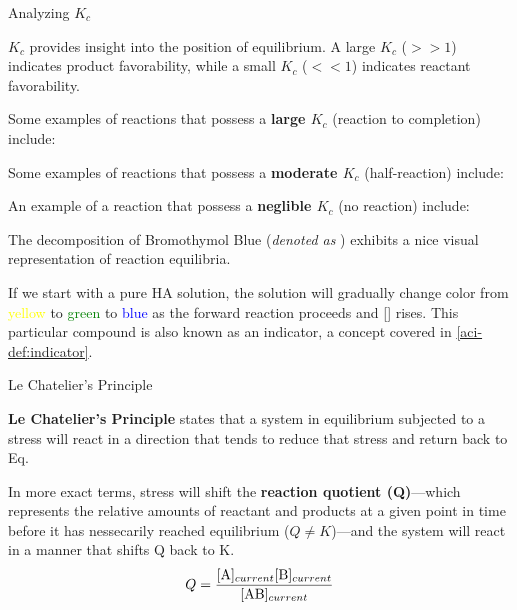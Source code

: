 \documentclass[10pt]{article}
\begin{document}
  \begin{core}{Analyzing $K_c$}
    
    $K_c$ provides insight into the position of equilibrium. A large $K_c$ ($>>1$) indicates product favorability, while a small $K_c$ ($<<1$) indicates reactant favorability.

    Some examples of reactions that possess a \textbf{large $K_c$} (reaction to completion) include:



    Some examples of reactions that possess a \textbf{moderate $K_c$} (half-reaction) include:




    An example of a reaction that possess a \textbf{neglible $K_c$} (no reaction) include:


  \end{core}

  The decomposition of Bromothymol Blue (\textit{denoted as }) exhibits a nice visual representation of reaction equilibria.
 

  If we start with a pure HA solution, the solution will gradually change color from \textcolor{Yellow}{yellow} to \textcolor{Green}{green} to \textcolor{Blue}{blue} as the forward reaction proceeds and [] rises. This particular compound is also known as an indicator, a concept covered in \autoref{aci-def:indicator}.
  
  \begin{definition}[label=placeholder3]{Le Chatelier's Principle}

    \textbf{Le Chatelier's Principle} states that a system in equilibrium subjected to a stress will react in a direction that tends to reduce that stress and return back to Eq.

    In more exact terms, stress will shift the \textbf{reaction quotient (Q)}---which represents the relative amounts of reactant and products at a given point in time before it has nessecarily reached equilibrium ($Q \neq K$)---and the system will react in a manner that shifts Q back to K.
    \[
      Q = \frac{[\ce{A}]_{current}[\ce{B}]_{current}}{[\ce{AB}]_{current}}
    \] 

  \end{definition}
\end{document}
